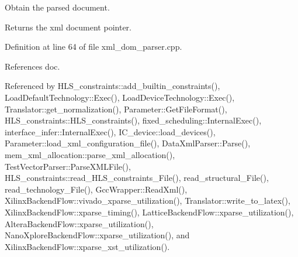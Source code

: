 Obtain the parsed document. 

\begin{DoxyReturn}{Returns}
the xml document pointer. 
\end{DoxyReturn}


Definition at line 64 of file xml\+\_\+dom\+\_\+parser.\+cpp.



References doc.



Referenced by H\+L\+S\+\_\+constraints\+::add\+\_\+builtin\+\_\+constraints(), Load\+Default\+Technology\+::\+Exec(), Load\+Device\+Technology\+::\+Exec(), Translator\+::get\+\_\+normalization(), Parameter\+::\+Get\+File\+Format(), H\+L\+S\+\_\+constraints\+::\+H\+L\+S\+\_\+constraints(), fixed\+\_\+scheduling\+::\+Internal\+Exec(), interface\+\_\+infer\+::\+Internal\+Exec(), I\+C\+\_\+device\+::load\+\_\+devices(), Parameter\+::load\+\_\+xml\+\_\+configuration\+\_\+file(), Data\+Xml\+Parser\+::\+Parse(), mem\+\_\+xml\+\_\+allocation\+::parse\+\_\+xml\+\_\+allocation(), Test\+Vector\+Parser\+::\+Parse\+X\+M\+L\+File(), H\+L\+S\+\_\+constraints\+::read\+\_\+\+H\+L\+S\+\_\+constraints\+\_\+\+File(), read\+\_\+structural\+\_\+\+File(), read\+\_\+technology\+\_\+\+File(), Gcc\+Wrapper\+::\+Read\+Xml(), Xilinx\+Backend\+Flow\+::vivado\+\_\+xparse\+\_\+utilization(), Translator\+::write\+\_\+to\+\_\+latex(), Xilinx\+Backend\+Flow\+::xparse\+\_\+timing(), Lattice\+Backend\+Flow\+::xparse\+\_\+utilization(), Altera\+Backend\+Flow\+::xparse\+\_\+utilization(), Nano\+Xplore\+Backend\+Flow\+::xparse\+\_\+utilization(), and Xilinx\+Backend\+Flow\+::xparse\+\_\+xst\+\_\+utilization().

